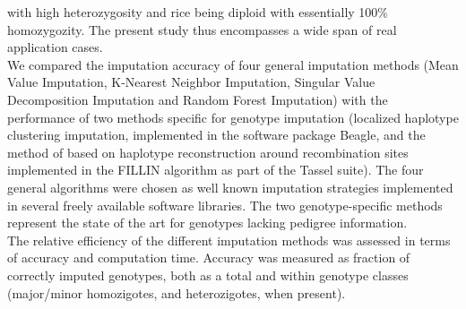 with high heterozygosity and rice being diploid with essentially 100\% homozygozity.
The present study thus encompasses a wide span of real application cases.\\
We compared the imputation accuracy of four general imputation methods (Mean
Value Imputation, K-Nearest Neighbor Imputation, Singular Value Decomposition
Imputation and Random Forest Imputation) with the performance of two methods specific 
for genotype imputation (localized haplotype clustering imputation, 
implemented in the software package Beagle, and the method of based on haplotype
reconstruction around recombination sites implemented in the FILLIN algorithm
as part of the Tassel suite). The four general algorithms were chosen as well known 
imputation strategies implemented in several freely available software libraries.
The two genotype-specific methods represent the state of the art 
for genotypes lacking pedigree information.\\
The relative efficiency of the different imputation methods was assessed in terms of 
accuracy and computation time. Accuracy was measured as fraction of 
correctly imputed genotypes, both as a total and within genotype classes 
(major/minor homozigotes, and heterozigotes, when present).

